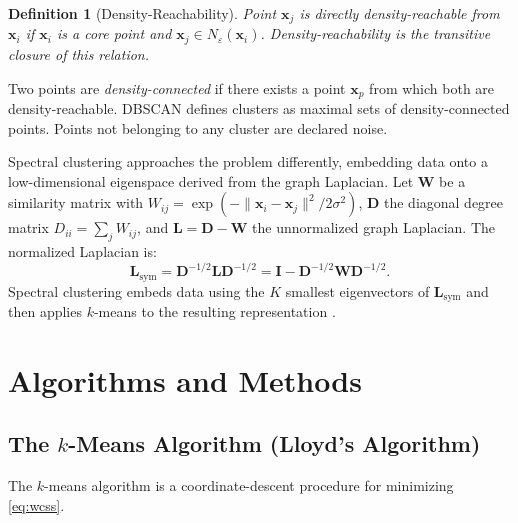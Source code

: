 \documentclass[conference]{IEEEtran}
\newtheorem{definition}{Definition}
\begin{document}
\begin{definition}[Density-Reachability]
Point $\mathbf{x}_j$ is \emph{directly density-reachable} from $\mathbf{x}_i$ if $\mathbf{x}_i$ is a core point and $\mathbf{x}_j \in N_\varepsilon(\mathbf{x}_i)$. Density-reachability is the transitive closure of this relation.
\end{definition}

Two points are \emph{density-connected} if there exists a point $\mathbf{x}_p$ from which both are density-reachable. DBSCAN \cite{ester1996density} defines clusters as maximal sets of density-connected points. Points not belonging to any cluster are declared noise.

Spectral clustering \cite{ng2002spectral} approaches the problem differently, embedding data onto a low-dimensional eigenspace derived from the graph Laplacian. Let $\mathbf{W}$ be a similarity matrix with $W_{ij} = \exp(-\|\mathbf{x}_i - \mathbf{x}_j\|^2 / 2\sigma^2)$, $\mathbf{D}$ the diagonal degree matrix $D_{ii} = \sum_j W_{ij}$, and $\mathbf{L} = \mathbf{D} - \mathbf{W}$ the unnormalized graph Laplacian. The normalized Laplacian is:
\begin{equation}
\mathbf{L}_\mathrm{sym} = \mathbf{D}^{-1/2}\mathbf{L}\mathbf{D}^{-1/2} = \mathbf{I} - \mathbf{D}^{-1/2}\mathbf{W}\mathbf{D}^{-1/2}.
\label{eq:laplacian}
\end{equation}
Spectral clustering embeds data using the $K$ smallest eigenvectors of $\mathbf{L}_\mathrm{sym}$ and then applies $k$-means to the resulting representation \cite{von2007tutorial}.

\section{Algorithms and Methods}
\label{sec:algorithms}

\subsection{The $k$-Means Algorithm (Lloyd's Algorithm)}

The $k$-means algorithm \cite{macqueen1967methods, lloyd1982least} is a coordinate-descent procedure for minimizing \eqref{eq:wcss}.
\end{document}
